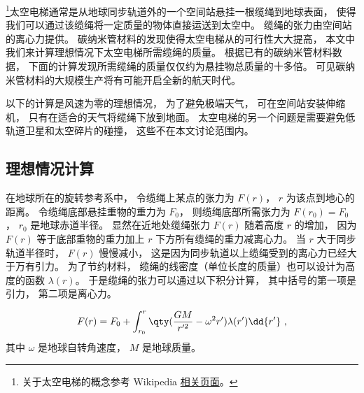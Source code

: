 

\footnote{关于太空电梯的概念参考 Wikipedia \href{https://en.wikipedia.org/wiki/Space_elevator}{相关页面}。}太空电梯通常是从地球同步轨道外的一个空间站悬挂一根缆绳到地球表面， 使得我们可以通过该缆绳将一定质量的物体直接运送到太空中。 缆绳的张力由空间站的离心力提供。 碳纳米管材料的发现使得太空电梯从的可行性大大提高， 本文中我们来计算理想情况下太空电梯所需缆绳的质量。 根据已有的碳纳米管材料数据， 下面的计算发现所需缆绳的质量仅仅约为悬挂物总质量的十多倍。 可见碳纳米管材料的大规模生产将有可能开启全新的航天时代。

以下的计算是风速为零的理想情况， 为了避免极端天气， 可在空间站安装伸缩机， 只有在适合的天气将缆绳下放到地面。 太空电梯的另一个问题是需要避免低轨道卫星和太空碎片的碰撞， 这些不在本文讨论范围内。

\subsection{理想情况计算}
在地球所在的旋转参考系中， 令缆绳上某点的张力为 $F(r)$， $r$ 为该点到地心的距离。 令缆绳底部悬挂重物的重力为 $F_0$， 则缆绳底部所需张力为 $F(r_0) = F_0$， $r_0$ 是地球赤道半径。 显然在近地处缆绳张力 $F(r)$ 随着高度 $r$ 的增加， 因为 $F(r)$ 等于底部重物的重力加上 $r$ 下方所有缆绳的重力减离心力。 当 $r$ 大于同步轨道半径时， $F(r)$ 慢慢减小， 这是因为同步轨道以上缆绳受到的离心力已经大于万有引力。 为了节约材料， 缆绳的线密度（单位长度的质量）也可以设计为高度的函数 $\lambda(r)$。 于是缆绳的张力可以通过以下积分计算， 其中括号的第一项是引力， 第二项是离心力。

\begin{equation}\label{eq_SpcLad_1}
F(r) = F_0 + \int_{r_0}^{r} \qty(\frac{GM}{r'^2} - \omega^2 r') \lambda(r') \dd{r'}~,
\end{equation}
其中 $\omega$ 是地球自转角速度， $M$ 是地球质量。


